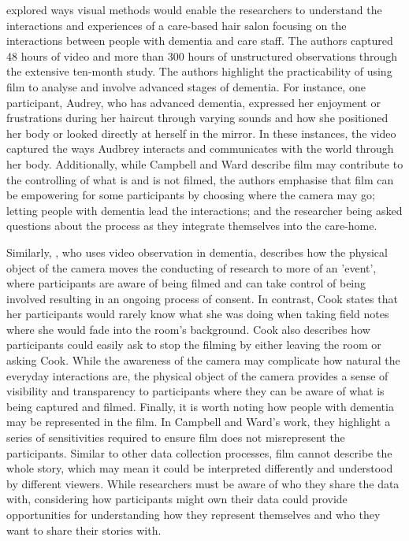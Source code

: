\cite{campbell2017video} explored ways visual methods would enable the researchers to understand the interactions and experiences of a care-based hair salon focusing on the interactions between people with dementia and care staff. The authors captured 48 hours of video and more than 300 hours of unstructured observations through the extensive ten-month study. The authors highlight the practicability of using film to analyse and involve advanced stages of dementia. For instance, one participant, Audrey, who has advanced dementia, expressed her enjoyment or frustrations during her haircut through varying sounds and how she positioned her body or looked directly at herself in the mirror. In these instances, the video captured the ways Audbrey interacts and communicates with the world through her body. Additionally, while Campbell and Ward describe film may contribute to the controlling of what is and is not filmed, the authors emphasise that film can be empowering for some participants by choosing where the camera may go; letting people with dementia lead the interactions; and the researcher being asked questions about the process as they integrate themselves into the care-home. 

Similarly, \cite{cook2002using}, who uses video observation in dementia, describes how the physical object of the camera moves the conducting of research to more of an 'event', where participants are aware of being filmed and can take control of being involved resulting in an ongoing process of consent. In contrast, Cook states that her participants would rarely know what she was doing when taking field notes where she would fade into the room's background. Cook also describes how participants could easily ask to stop the filming by either leaving the room or asking Cook. While the awareness of the camera may complicate how natural the everyday interactions are, the physical object of the camera provides a sense of visibility and transparency to participants where they can be aware of what is being captured and filmed. Finally, it is worth noting how people with dementia may be represented in the film. In Campbell and Ward's work, they highlight a series of sensitivities required to ensure film does not misrepresent the participants. Similar to other data collection processes, film cannot describe the whole story, which may mean it could be interpreted differently and understood by different viewers. While researchers must be aware of who they share the data with, considering how participants might own their data could provide opportunities for understanding how they represent themselves and who they want to share their stories with.

